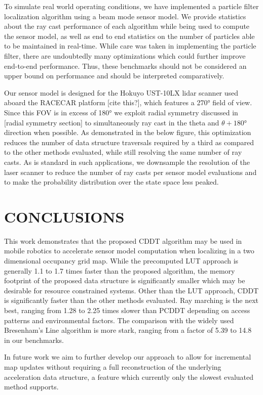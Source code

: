 \documentclass[letterpaper, 10 pt, conference]{ieeeconf}  %
\begin{document}
To simulate real world operating conditions, we have implemented a particle filter localization algorithm using a beam mode sensor model. We provide statistics about the ray cast performance of each algorithm while being used to compute the sensor model, as well as end to end statistics on the number of particles able to be maintained in real-time. While care was taken in implementing the particle filter, there are undoubtedly many optimizations which could further improve end-to-end performance. Thus, these benchmarks should not be considered an upper bound on performance and should be interpreted comparatively.

Our sensor model is designed for the Hokuyo UST-10LX lidar scanner used aboard the RACECAR platform [cite this?], which features a 270° field of view. Since this FOV is in excess of 180° we exploit radial symmetry discussed in [radial symmetry section] to simultaneously ray cast in the theta and $\theta+180°$ direction when possible. As demonstrated in the below figure, this optimization reduces the number of data structure traversals required by a third as compared to the other methods evaluated, while still resolving the same number of ray casts. As is standard in such applications, we downsample the resolution of the laser scanner to reduce the number of ray casts per sensor model evaluations and to make the probability distribution over the state space less peaked.

\section{CONCLUSIONS}

This work demonstrates that the proposed CDDT algorithm may be used in mobile robotics to accelerate sensor model computation when localizing in a two dimensional occupancy grid map. While the precomputed LUT approach is generally 1.1 to 1.7 times faster than the proposed algorithm, the memory footprint of the proposed data structure is significantly smaller which may be desirable for resource constrained systems. Other than the LUT approach, CDDT is significantly faster than the other methods evaluated. Ray marching is the next best, ranging from 1.28 to 2.25 times slower than PCDDT depending on access patterns and environmental factors. The comparison with the widely used Bresenham's Line algorithm is more stark, ranging from a factor of 5.39 to 14.8 in our benchmarks.

In future work we aim to further develop our approach to allow for incremental map updates without requiring a full reconstruction of the underlying acceleration data structure, a feature which currently only the slowest evaluated method supports.
\end{document}

